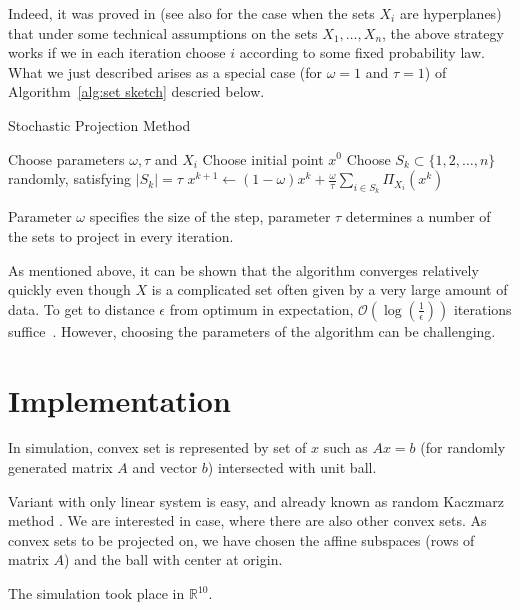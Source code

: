 \documentclass[11pt]{book}
\newcommand{\R}{\mathbb{R}}
\theoremstyle{definition}
\begin{document}
	Indeed, it was proved in \cite{projectionFeasibility} (see also \cite{kaczmarz} for the case when the sets $X_i$ are hyperplanes) that under some technical assumptions on the sets $X_1,\dots,X_n$, the above strategy works if we in each iteration choose $i$ according to some fixed probability law. What we just described arises as a special case (for $\omega=1$ and $\tau=1$) of Algorithm~\ref{alg:set sketch} descried below.
	
	\begin{algorithm}[H]
		\caption{Stochastic Projection Method~\cite{projectionFeasibility}}
		\label{alg:set sketch}
		\begin{algorithmic}[1]
			\State Choose parameters $\omega, \tau$ and $ X_i$
			\State Choose initial point $x^0$
			\State Choose $S_k\subset \{1,2,\dots,n\}$ randomly, satisfying $|S_k| = \tau$
			\State $x^{k+1} \leftarrow (1 - \omega)x^k + \frac{\omega}{\tau}\sum_{i \in S_k} \Pi_{X_i}(x^k)$
			\EndFor
		\end{algorithmic}
	\end{algorithm}
	
	
	Parameter $\omega$ specifies the size of the step, parameter $\tau$ determines a number of the sets to project in every iteration.
	
	As mentioned above, it can be shown that the algorithm converges relatively quickly even though $X$ is a complicated set often given by a very large amount of data. To get to distance $\epsilon$ from optimum in expectation,  $\mathcal{O} (\log(\frac{1}{\epsilon}))$ iterations suffice~\cite{sketchAndProject,kaczmarz}.  However, choosing the parameters of the algorithm can be challenging.
	
	\section{Implementation}
	
	In simulation, convex set is represented by set of $x$ such as $Ax=b$ (for randomly generated matrix $A$ and vector $b$) intersected with unit ball.
	
	Variant with only linear system is easy, and already known as random Kaczmarz method \cite{kaczmarz, iterativeLinearSystems}. We are interested in case, where there are also other convex sets. As convex sets to be projected on, we have chosen the affine subspaces (rows of matrix $A$) and the ball with center at origin.
	
	The simulation took place in $\R^{10}$.\\
	
\end{document}
